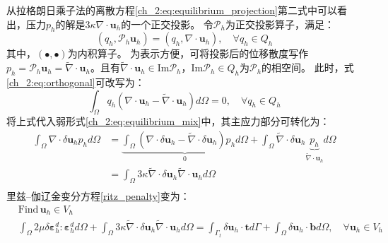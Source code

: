 从拉格朗日乘子法的离散方程\eqref{ch_2:eq:equilibrium_projection}第二式中可以看出，压力$p_h$的解是$3\kappa \nabla \cdot \boldsymbol u_h$的一个正交投影。
令$\mathcal P_h$为正交投影算子，满足：
\begin{equation}\label{ch_2:eq:orthogonal}
    (q_h,\mathcal P_h \boldsymbol u_h) = (q_h, \nabla \cdot \boldsymbol u_h), \quad \forall q_h \in Q_h
\end{equation}
其中，$(\bullet,\bullet)$为内积算子。
为表示方便，可将投影后的位移散度写作$p_h=\mathcal P_h \boldsymbol u_h = \tilde \nabla \cdot \boldsymbol u_h$。且有$\tilde \nabla \cdot \boldsymbol u_h \in \mathrm{Im} \mathcal P_h$，$\mathrm{Im} \mathcal P_h \in Q_h$为$\mathcal P_h$的相空间\cite{philippeg.2013}。
此时，式\eqref{ch_2:eq:orthogonal}可改写为：
\begin{equation}
    \int_\Omega q_h(\nabla \cdot \boldsymbol u_h - \tilde \nabla \cdot \boldsymbol u_h) d\Omega = 0, \quad \forall q_h \in Q_h
\end{equation}
将上式代入弱形式\eqref{ch_2:eq:equilibrium_mix}中，其主应力部分可转化为：
\begin{equation}\label{projection_mixed}
    \begin{split}
        \int_\Omega \nabla \cdot \delta \boldsymbol u_h p_h d\Omega &= \underbrace{\int_\Omega (\nabla \cdot \delta  \boldsymbol u_h - \tilde \nabla \cdot \delta \boldsymbol u_h) p_h d\Omega}_0 + \int_\Omega \tilde \nabla \cdot \delta \boldsymbol u_h \underbrace{p_h}_{\tilde \nabla \cdot \boldsymbol u_h} d\Omega \\
        &= \int_\Omega 3\kappa \tilde \nabla \cdot \delta \boldsymbol u_h \tilde \nabla \cdot \boldsymbol u_h d\Omega \\
    \end{split}
\end{equation}
里兹--伽辽金变分方程\eqref{ritz_penalty}变为：
\begin{equation}\label{ch_2:eq:ritz_mix}
    \begin{split}
        &\text{Find} \,\boldsymbol u_h \in V_h\\
    &\int_\Omega 2\mu \delta \boldsymbol \varepsilon^d_h : \boldsymbol \varepsilon^d_h d\Omega +
    \int_\Omega 3\kappa \tilde \nabla \cdot \delta \boldsymbol u_h \tilde \nabla \cdot \boldsymbol u_h d\Omega =
    \int_{\Gamma_t} \delta \boldsymbol u_h \cdot \boldsymbol t d\Gamma + \int_\Omega \delta \boldsymbol u_h \cdot \boldsymbol b d\Omega, \quad \forall \boldsymbol u_h \in V_h
    \end{split}
\end{equation}

